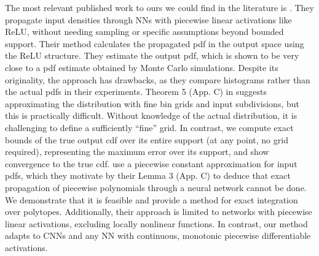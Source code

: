 The most relevant published work to ours we could find in the literature is \citet{Krapfetal2024}. They propagate input densities through NNs with piecewise linear activations like ReLU, without needing sampling or specific assumptions beyond bounded support. Their method calculates the propagated pdf in the output space using the ReLU structure. They estimate the output pdf, which is shown to be very close to a pdf estimate obtained by Monte Carlo simulations. Despite its originality, the approach has drawbacks, as they compare histograms rather than the actual pdfs in their experiments. Theorem 5 (App. C) in \cite{Krapfetal2024} suggests approximating the distribution with fine bin grids and input subdivisions, but this is practically difficult. Without knowledge of the actual distribution, it is challenging to define a sufficiently ``fine'' grid. In contrast, we compute exact bounds of the true output cdf over its entire support (at any point, no grid required), representing the maximum error over its support, and show %
convergence to the true cdf. %
\citet{Krapfetal2024} use a piecewise constant approximation for input pdfs, which they motivate by their Lemma 3 (App. C) to deduce that exact propagation of piecewise polynomials through a neural network cannot be done. 
We demonstrate that it is feasible and provide a method for exact integration over polytopes. Additionally, their approach is limited to networks with piecewise linear activations, excluding locally nonlinear functions. In contrast, our method adapts to CNNs and any NN with continuous, monotonic piecewise differentiable activations.